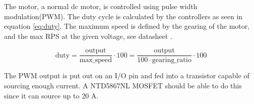 The motor, a normal dc motor, is controlled using pulse width modulation(PWM). The duty cycle is calculated by the controllers as seen in equation \ref{eq:duty}. The maximum speed is defined by the gearing of the motor, and the max RPS at the given voltage, see datasheet \cite{datasheet:motor}. 

\begin{equation}\label{eq:duty}
 \text{duty} = \frac{\text{output}}{\text{max\_speed}}\cdot 100 = \frac{\text{output}}{100\cdot \text{gearing\_ratio}}\cdot 100
\end{equation}

The PWM output is put out on an I/O pin and fed into a transistor capable of sourcing enough current.
A NTD5867NL MOSFET should be able to do this since it can source up to 20 A\cite{datasheet:mosfet}.